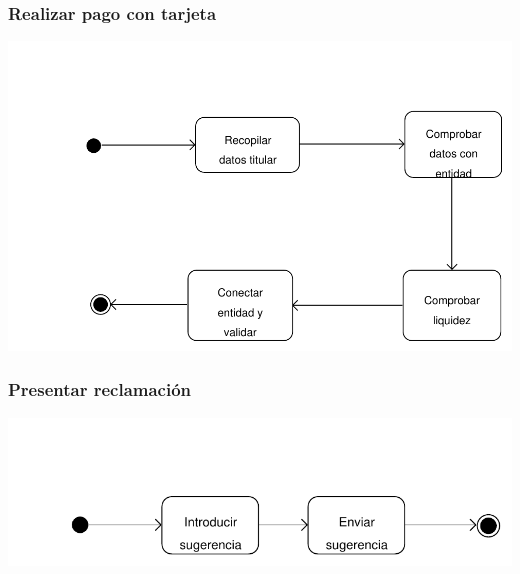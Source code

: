 \documentclass[11pt, a4paper, twoside, titlepage]{article}
\begin{document}
			\subsubsection{Realizar pago con tarjeta}
				\begin{center}
					\includegraphics[scale=.7]{analisis/diagramas/da_pagotarjeta.pdf}
				\end{center}

			\subsubsection{Presentar reclamación}
				\begin{center}
					\includegraphics[scale=.82]{analisis/diagramas/da_presentarreclamacion.pdf}
				\end{center}
\end{document}
